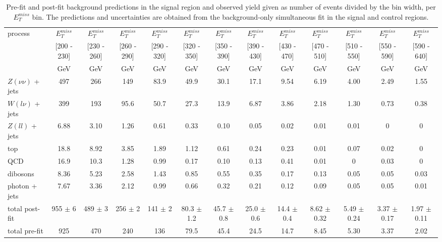 \begin{landscape}

\begin{table}[p]
  \centering
\caption{Pre-fit and post-fit background predictions in the signal region and observed yield given as number of events divided by the bin width, per $E_T^{miss}$ bin. The predictions and uncertainties are obtained from the background-only simultaneous fit in the signal and control regions.}
\label{tab:monojet_yields_1}
\scriptsize
\begin{subtable}{}
\renewcommand{\arraystretch}{1.3}
\begin{tabular}{| l | c | c | c | c | c | c | c | c | c | c | c | c |}
\hline
\multirow{3}{*}{process} &  $E_T^{miss}$ &  $E_T^{miss}$ &  $E_T^{miss}$ &  $E_T^{miss}$ &  $E_T^{miss}$ &  $E_T^{miss}$ &  $E_T^{miss}$ &  $E_T^{miss}$ &  $E_T^{miss}$ &  $E_T^{miss}$ &  $E_T^{miss}$ &  $E_T^{miss}$  \\
 & [200 - 230] & [230 - 260] & [260 - 290] & [290 - 320] & [320 - 350] & [350 - 390] & [390 - 430] & [430 - 470] & [470 - 510] & [510 - 550] & [550 - 590] & [590 - 640]  \\
 & GeV & GeV & GeV & GeV & GeV & GeV & GeV & GeV & GeV & GeV & GeV & GeV \\
\hline
  $Z(\nu\nu)$ + jets & 497 & 266 & 149 & 83.9 & 49.9 & 30.1 & 17.1 & 9.54 & 6.19 & 4.00 & 2.49 & 1.55\\
  $W(l\nu)$ + jets & 399 & 193 & 95.6 & 50.7 & 27.3 & 13.9 & 6.87 & 3.86 & 2.18 & 1.30 & 0.73 & 0.38\\
  $Z(ll)$ + jets & 6.88 & 3.10 & 1.26 & 0.61 & 0.33 & 0.10 & 0.05 & 0.02 & 0.01 & 0.01 & 0 & 0 \\
  top & 18.8 & 8.92 & 3.85 & 1.89 & 1.12 & 0.61 & 0.24 & 0.23 & 0.01 & 0.07 & 0.02 & 0\\
  QCD & 16.9 & 10.3 & 1.28 & 0.99 & 0.17 & 0.10 & 0.13 & 0.41 & 0.01 & 0 & 0.03 & 0\\
  dibosons & 8.36 & 5.23 & 2.58 & 1.43 & 0.85 & 0.55 & 0.35 & 0.17 & 0.13 & 0.05 & 0.05 & 0.03\\
  photon + jets & 7.67 & 3.36 & 2.12 & 0.99 & 0.66 & 0.32 & 0.21 & 0.12 & 0.09 & 0.05 & 0.05 & 0.01 \\
\hline
  total post-fit & 955 $\pm$ 6 & 489 $\pm$ 3 & 256 $\pm$ 2 & 141 $\pm$ 2 & 80.3 $\pm$ 1.2 & 45.7 $\pm$ 0.8 & 25.0 $\pm$ 0.6 & 14.4 $\pm$ 0.4 & 8.62 $\pm$ 0.32 & 5.49 $\pm$ 0.24 & 3.37 $\pm$ 0.17 & 1.97 $\pm$ 0.11 \\
\hline
  total pre-fit & 925 & 470 & 240 & 136 & 79.5 & 45.4 & 24.5 & 14.7 & 8.45 & 5.30 & 3.37 & 2.02\\

\end{tabular}
\end{subtable}
\end{table}
\end{landscape}
